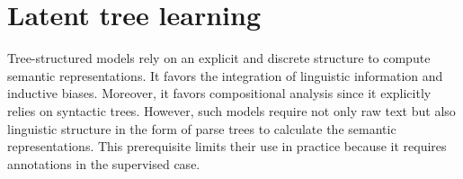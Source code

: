 


\section{Latent tree learning}

Tree-structured models rely on an explicit and discrete structure to compute semantic representations. It favors the integration of linguistic information and inductive biases. Moreover, it favors compositional analysis since it explicitly relies on syntactic trees. However, such models require not only raw text but also linguistic structure in the form of parse trees to calculate the semantic representations. This prerequisite limits their use in practice because it requires annotations in the supervised case. 

